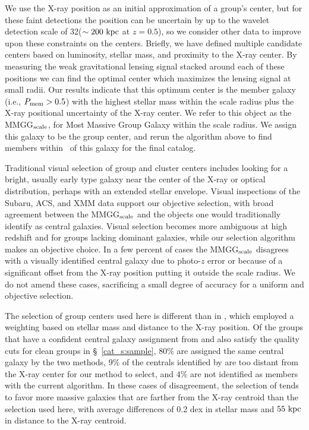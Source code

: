 We use the X-ray position as an initial approximation of a group's
center, but for these faint detections the position can be uncertain by
up to the wavelet detection scale of 32\arcsec  ($\sim200~\rm{kpc}$ at
$z=0.5$), so we consider other data to improve upon these constraints
on the centers. Briefly, we have defined multiple candidate 
centers based on luminosity, stellar mass, and proximity to the X-ray
center. By measuring the weak gravitational lensing signal stacked
around each of these positions we can find the optimal center which
maximizes the lensing signal at small radii. Our results indicate that
this optimum center is the member galaxy (i.e., $P_{\rm mem} > 0.5$)
with the highest stellar mass within 
the scale radius plus the X-ray positional uncertainty of the X-ray
center. We refer to this object as the MMGG$_{\rm scale}$, for Most
Massive Group Galaxy within the scale radius. We assign this
galaxy to be the group center, and rerun the algorithm above to find
members within \rvir\ of this galaxy for the final catalog. 

Traditional visual selection of group and cluster centers includes
looking for a bright, usually early type galaxy near the center of the
X-ray or optical distribution, perhaps with an extended stellar
envelope. Visual inspections of the Subaru, ACS, and XMM data
support our objective selection, with broad agreement between the MMGG$_{\rm
  scale}$ and the objects one would traditionally identify as central
galaxies. Visual selection becomes more ambiguous at high
redshift and for groups lacking dominant galaxies, while our selection
algorithm makes an objective choice. In a few percent of
cases the MMGG$_{\rm scale}$ disagrees with a visually identified
central galaxy due to photo-$z$ error or because of a significant
offset from the X-ray position putting it outside the scale radius. We
do not amend these cases, sacrificing a small degree of accuracy for a
uniform and objective selection. 

The selection of group centers used here is different than in
\citet{Leauthaud2010}, which employed a weighting based on stellar 
mass and distance to the X-ray position. Of the groups that have a
confident central galaxy assignment from \citet{Leauthaud2010} and also
satisfy the quality cuts for clean groups in \S~\ref{cat_s:sample},
$80\%$ are assigned the same central galaxy by the two methods, $9\%$
of the centrals identified by \citet{Leauthaud2010} are too distant
from the X-ray center for our method to select, and $4\%$ are not
identified as members with the current algorithm. In these cases of
disagreement, the selection of \citet{Leauthaud2010} tends to favor
more massive galaxies that are farther from the X-ray centroid than the
selection used here, with average differences of 0.2 dex in stellar
mass and $55~\rm{kpc}$ in distance to the X-ray centroid.


